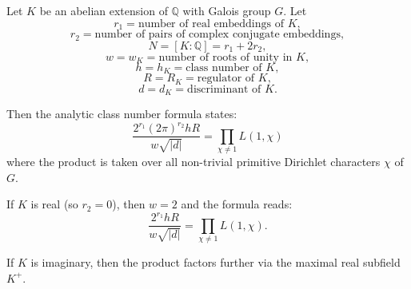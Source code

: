 Let $K$ be an abelian extension of $\mathbb{Q}$ with Galois group $G$. Let
$$r_1 = \text{number of real embeddings of } K,$$
$$r_2 = \text{number of pairs of complex conjugate embeddings},$$
$$N = [K : \mathbb{Q}] = r_1 + 2r_2,$$
$$w = w_K = \text{number of roots of unity in } K,$$
$$h = h_K = \text{class number of } K,$$
$$R = R_K = \text{regulator of } K,$$
$$d = d_K = \text{discriminant of } K.$$

Then the analytic class number formula states:
$$\frac{2^{r_1} (2\pi)^{r_2} h R}{w \sqrt{|d|}} = \prod_{\chi \neq 1} L(1, \chi)$$
where the product is taken over all non-trivial primitive Dirichlet characters $\chi$ of $G$.

If $K$ is real (so $r_2 = 0$), then $w = 2$ and the formula reads:
$$\frac{2^{r_1} h R}{w \sqrt{|d|}} = \prod_{\chi \neq 1} L(1, \chi).$$

If $K$ is imaginary, then the product factors further via the maximal real subfield $K^+$.
